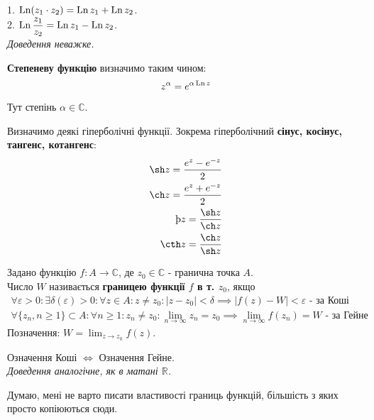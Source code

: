 \documentclass{math_library}
\begin{document}
\begin{proposition}
1. $\operatorname{Ln} (z_1 \cdot z_2) = \operatorname{Ln} z_1 + \operatorname{Ln} z_2$.\\
2. $\operatorname{Ln} \dfrac{z_1}{z_2} = \operatorname{Ln} z_1 - \operatorname{Ln} z_2$.\\
\textit{Доведення неважке.}
\end{proposition}

\begin{definition}
\textbf{Степеневу функцію} визначимо таким чином:
\begin{align*}
z^\alpha = e^{\alpha \operatorname{Ln} z}
\end{align*}
Тут степінь $\alpha \in \mathbb{C}$.
\end{definition}

\begin{definition}
Визначимо деякі гіперболічні функції. Зокрема гіперболічний \textbf{сінус, косінус, тангенс, котангенс}:
\begin{align*}
\sh z = \dfrac{e^z-e^{-z}}{2} \\
\ch z = \dfrac{e^z + e^{-z}}{2} \\ 
\th z = \dfrac{\sh z}{\ch z} \\
\cth z = \dfrac{\ch z}{\sh z}
\end{align*}
\end{definition}

\begin{definition}
Задано функцію $f: A \to \mathbb{C}$, де $z_0 \in \mathbb{C}$ - гранична точка $A$.\\
Число $W$ називається \textbf{границею функції $f$ в т. $z_0$}, якщо
\begin{align*}
\forall \varepsilon > 0: \exists \delta(\varepsilon)>0: \forall z \in A: z \neq z_0: |z-z_0| < \delta \implies |f(z) - W| < \varepsilon \text{ - за Коші} \\
\forall \{z_n, n \geq 1 \} \subset A: \forall n \geq 1: z_n \neq z_0: \lim_{n \to \infty} z_n = z_0 \implies \lim_{n \to \infty} f(z_n) = W \text{ - за Гейне}
\end{align*}
Позначення: $W = \displaystyle\lim_{z \to z_0} f(z)$.
\end{definition}

\begin{theorem}
Означення Коші $\iff$ Означення Гейне.\\
\textit{Доведення аналогічне, як в матані $\mathbb{R}$.}
\end{theorem}

\begin{remark}
Думаю, мені не варто писати властивості границь функцій, більшість з яких просто копіюються сюди.
\end{remark}
\end{document}

